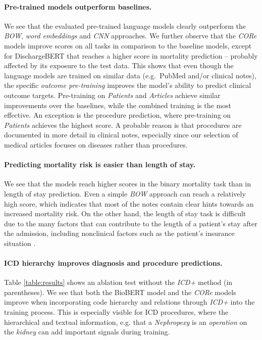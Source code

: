 \documentclass[11pt,a4paper]{article}
\begin{document}
\paragraph{Pre-trained models outperform baselines.}
We see that the evaluated pre-trained language models clearly outperform the \textit{BOW}, \textit{word embeddings} and \textit{CNN} approaches. We further observe that the \textit{CORe} models improve scores on all tasks in comparison to the baseline models, except for DischargeBERT that reaches a higher score in mortality prediction -- probably affected by its exposure to the test data. This shows that even though the language models are trained on similar data (e.g.~PubMed and/or clinical notes), the specific \textit{outcome pre-training} improves the model's ability to predict clinical outcome targets. Pre-training on \textit{Patients} and \textit{Articles} achieve similar improvements over the baselines, while the combined training is the most effective. An exception is the procedure prediction, where pre-training on \textit{Patients} achieves the highest score. A probable reason is that procedures are documented in more detail in clinical notes, especially since our selection of medical articles focuses on diseases rather than procedures.

\paragraph{Predicting mortality risk is easier than length of stay.} We see that the models reach higher scores in the binary mortality task than in length of stay prediction. Even a simple \textit{BOW} approach can reach a relatively high score, which indicates that most of the notes contain clear hints towards an increased mortality risk. On the other hand, the length of stay task is difficult due to the many factors that can contribute to the length of a patient's stay after the admission, including nonclinical factors such as the patient's insurance situation \cite{los-factors}.

\paragraph{ICD hierarchy improves diagnosis and procedure predictions.} Table \ref{table:results} shows an ablation test without the \textit{ICD+} method (in parentheses). We see that both the BioBERT model and the \textit{CORe} models  improve when incorporating code hierarchy and relations through \textit{ICD+} into the training process. This is especially visible for ICD procedures, where the hierarchical and textual information, e.g. that a \textit{Nephropexy} is an \textit{operation} on the \textit{kidney} can add important signals during training. 
\end{document}
